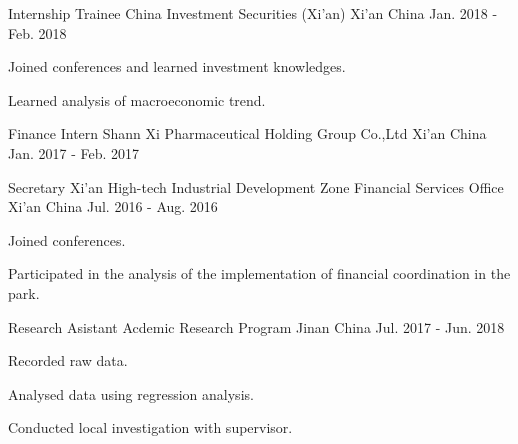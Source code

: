 


\begin{cventries}


\cventry
{Internship Trainee} %
{China Investment Securities (Xi'an)} %
{Xi'an China} %
{Jan. 2018 - Feb. 2018} %
{ %
\begin{cvitems}
\item {Joined conferences and learned investment knowledges.}
\item {Learned analysis of macroeconomic trend.}
\end{cvitems}
}


\cventry
{Finance Intern} %
{Shann Xi Pharmaceutical Holding Group Co.,Ltd} %
{Xi'an China} %
{Jan. 2017 - Feb. 2017} %
{ %
}


\cventry
{Secretary} %
{Xi'an High-tech Industrial Development Zone Financial Services Office} %
{Xi'an China} %
{Jul. 2016 - Aug. 2016} %
{ %
\begin{cvitems}
\item {Joined conferences.}
\item {Participated in the analysis of the implementation of financial coordination in the park.}
\end{cvitems} 
}


\cventry
{Research Asistant} %
{Acdemic Research Program} %
{Jinan China} %
{Jul. 2017 - Jun. 2018} %
{ %
\begin{cvitems}
\item {Recorded raw data.}
\item {Analysed data using regression analysis.}
\item {Conducted local investigation with supervisor.}
\end{cvitems}
}



\end{cventries}